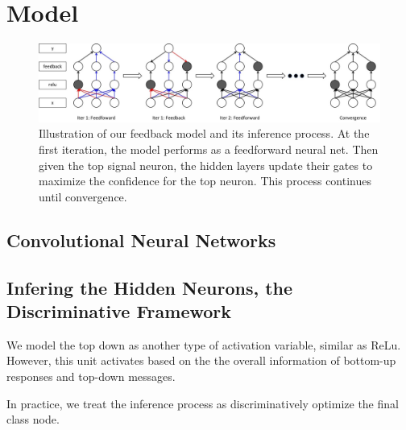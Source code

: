 \section{Model}
\label{sec:model}

\setlength{\tabcolsep}{2pt}
\begin{figure}
\begin{center}
\includegraphics[width=0.95\linewidth]{figs/model/model}
\caption{Illustration of our feedback model and its inference process. At the first iteration, the model performs as a feedforward neural net. Then given the top signal neuron, the hidden layers update their gates to maximize the confidence for the top neuron. This process continues until convergence.}
\label{fig:visual_compare}
\end{center}
\end{figure}

\subsection{Convolutional Neural Networks}

\subsection{Infering the Hidden Neurons, the Discriminative Framework}


We model the top down as another type of activation variable, similar as ReLu. However, this unit activates based on the the overall information of bottom-up responses and top-down messages. 

In practice, we treat the inference process as discriminatively optimize the final class node. 


